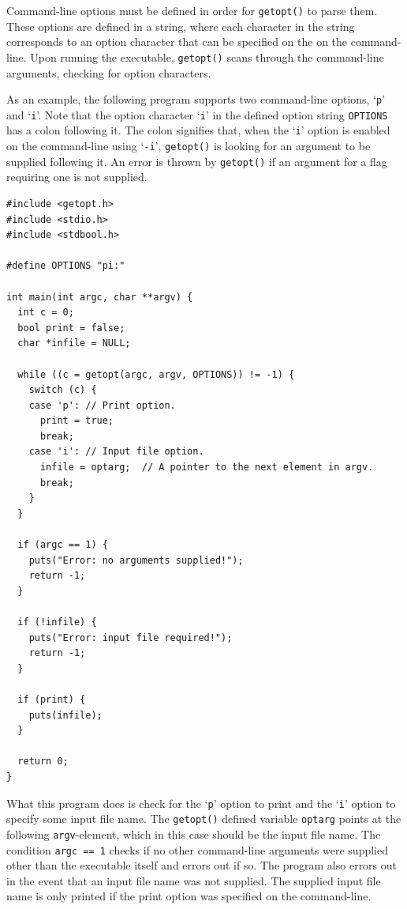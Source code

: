 \documentclass[11pt]{article}
\begin{document}
Command-line options must be defined in order for \texttt{getopt()} to
parse them. These options are defined in a string, where each character in the
string corresponds to an option character that can be specified on the on the
command-line. Upon running the executable,
\texttt{getopt()} scans through the command-line arguments, checking for option
characters.

As an example, the following program supports two command-line options,
`\texttt{p}' and `\texttt{i}'. Note that the option character `\texttt{i}' in the defined option string
\texttt{OPTIONS} has a colon following it. The colon signifies that, when the
`\texttt{i}' option is enabled on the command-line using `\texttt{-i}', \texttt{getopt()} is
looking for an argument to be supplied following it. An error is thrown by
\texttt{getopt()} if an argument for a flag requiring one is not supplied.

\begin{lstlisting}
#include <getopt.h>
#include <stdio.h>
#include <stdbool.h>

#define OPTIONS "pi:"

int main(int argc, char **argv) {
  int c = 0;
  bool print = false;
  char *infile = NULL;

  while ((c = getopt(argc, argv, OPTIONS)) != -1) {
    switch (c) {
    case 'p': // Print option.
      print = true;
      break;
    case 'i': // Input file option.
      infile = optarg;  // A pointer to the next element in argv.
      break;
    }
  }

  if (argc == 1) {
    puts("Error: no arguments supplied!");
    return -1;
  }

  if (!infile) {
    puts("Error: input file required!");
    return -1;
  }

  if (print) {
    puts(infile);
  }

  return 0;
}
\end{lstlisting}

What this program does is check for the `\texttt{p}' option to print and the
`\texttt{i}' option to specify some input file name.
The \texttt{getopt()} defined variable \texttt{optarg} points at the following
\texttt{argv}-element, which in this case should be the input file name. The
condition \texttt{argc == 1} checks if no other command-line arguments were
supplied other than the executable itself and errors out if so. The program also
errors out in the event that an input file name was not supplied. The supplied
input file name is only printed if the print option was specified on the
command-line.
\end{document}
